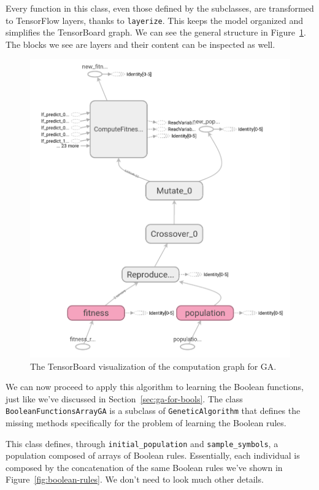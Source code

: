 Every function in this class, even those defined by the subclasses, are
transformed to TensorFlow layers, thanks to \texttt{layerize}. This keeps the
model organized and simplifies the TensorBoard graph. We can see the general
structure in Figure~\ref{fig:tb-graph-ga}. The blocks we see are layers and
their content can be inspected as well.
\begin{figure}
	\centering
	\includegraphics[height=0.45\textheight]{./imgs/ga-graph.png}
	\caption{The TensorBoard visualization of the computation graph for GA.}
	\label{fig:tb-graph-ga}
\end{figure}

We can now proceed to apply this algorithm to learning the Boolean functions,
just like we've discussed in Section~\ref{sec:ga-for-bools}.
The class \texttt{BooleanFunctionsArrayGA} is a subclass of
\texttt{GeneticAlgorithm} that defines the missing methods specifically for
the problem of learning the Boolean rules.

This class defines, through \verb|initial_population| and
\verb|sample_symbols|, a population composed of arrays of Boolean rules.
Essentially, each individual is composed by the concatenation of the same
Boolean rules we've shown in Figure~\vref{fig:boolean-rules}. We don't need to
look much other details.

